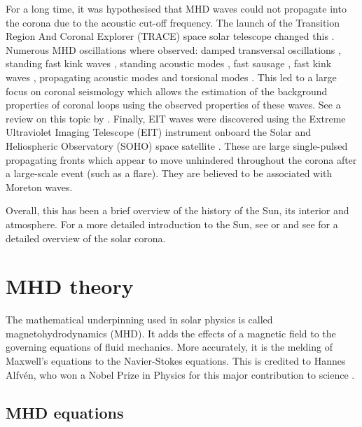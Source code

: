     For a long time, it was hypothesised that MHD waves could not propagate into the corona due to the acoustic cut-off frequency.
    The launch of the Transition Region And Coronal Explorer (TRACE) space solar telescope changed this \citep{TRACE,TRACE1}.
    Numerous MHD oscillations where observed: damped transversal oscillations \citep{8007,2002A&A...394L..39G}, standing fast kink waves \citep{1999ApJ520880A,1999Sci...285..862N,1999SoPh..187..261S}, standing acoustic modes \citep{2003A&A...406.1105W}, fast sausage \citep{2001MNRAS.326..428W,2002MNRAS.336..747W,2003A&A...406..709K}, fast kink waves \citep{2005A&A...430L..65V}, propagating acoustic modes \citep{1997ApJ...491L.111O,2000A&A...355L..23D,2002A&A...393..649M} and torsional modes \citep{1998A&A...337..287E}. 
    This led to a large focus on coronal seismology which allows the estimation of the background properties of coronal loops using the observed properties of these waves.
    See a review on this topic by \cite{lrsp-2005-3}.
    Finally, EIT waves were discovered using the Extreme Ultraviolet Imaging Telescope (EIT) instrument onboard the Solar and Heliospheric Observatory (SOHO) space satellite \citep{1998GeoRL..25.2465T}.
    These are large single-pulsed propagating fronts which appear to move unhindered throughout the corona after a large-scale event (such as a flare).
    They are believed to be associated with Moreton waves.
        
    Overall, this has been a brief overview of the history of the Sun, its interior and atmosphere. 
    For a more detailed introduction to the Sun, see \cite{priest1984solar} or \cite{2014masu.book.....P} and see \cite{markus2004physics} for a detailed overview of the solar corona.
    
\section{MHD theory}

    The mathematical underpinning used in solar physics is called magnetohydrodynamics (MHD).
    It adds the effects of a magnetic field to the governing equations of fluid mechanics. 
    More accurately, it is the melding of Maxwell's equations to the Navier-Stokes equations.
    This is credited to Hannes Alfv\'en, who won a Nobel Prize in Physics for this major contribution to science \citep{1942Natur.150..405A,erdelyi2007}.

\subsection{MHD equations}

